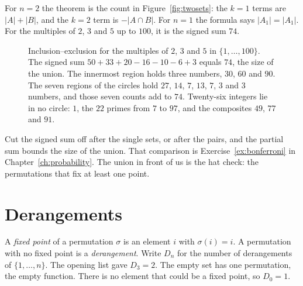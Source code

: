 For $n=2$ the theorem is the count in Figure~\ref{fig:twosets}: the $k=1$ terms are $|A|+|B|$, and the $k=2$ term is $-|A\cap B|$. For $n=1$ the formula says $|A_1|=|A_1|$. For the multiples of $2$, $3$ and $5$ up to $100$, it is the signed sum $74$.

\begin{figure}[ht]
\centering
{}
\caption{Inclusion--exclusion for the multiples of $2$, $3$ and $5$ in $\{1,\dots,100\}$. The signed sum $50+33+20-16-10-6+3$ equals $74$, the size of the union. The innermost region holds three numbers, $30$, $60$ and $90$. The seven regions of the circles hold $27$, $14$, $7$, $13$, $7$, $3$ and $3$ numbers, and those seven counts add to $74$. Twenty-six integers lie in no circle: $1$, the $22$ primes from $7$ to $97$, and the composites $49$, $77$ and $91$.}
\label{fig:venn}
\end{figure}

Cut the signed sum off after the single sets, or after the pairs, and the partial sum bounds the size of the union. That comparison is Exercise~\ref{ex:bonferroni} in Chapter~\ref{ch:probability}. The union in front of us is the hat check: the permutations that fix at least one point.

\section{Derangements}

A \emph{fixed point} of a permutation $\sigma$ is an element $i$ with $\sigma(i)=i$. A permutation with no fixed point is a \emph{derangement}. Write $D_n$ for the number of derangements of $\{1,\dots,n\}$. The opening list gave $D_3=2$. The empty set has one permutation, the empty function. There is no element that could be a fixed point, so $D_0=1$.

